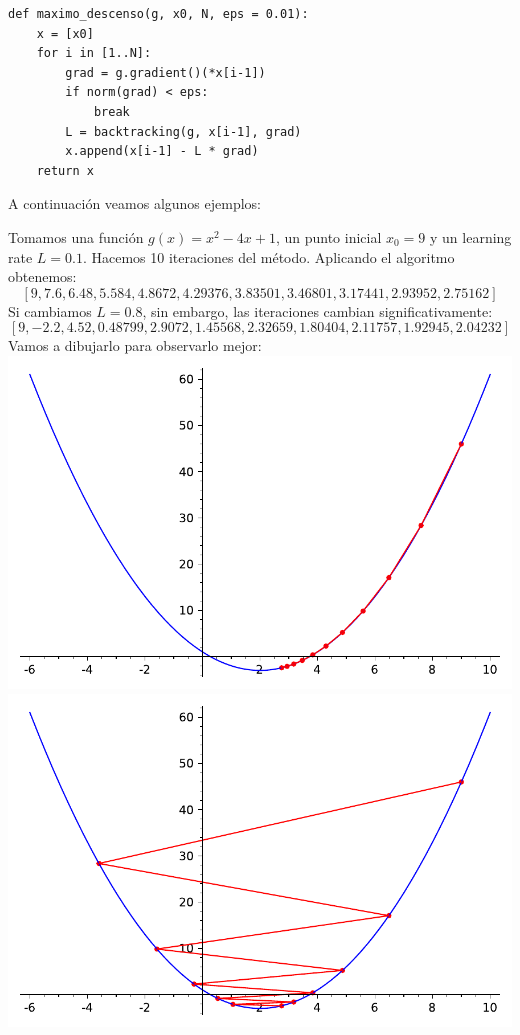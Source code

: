 \begin{verbatim}
def maximo_descenso(g, x0, N, eps = 0.01):
	x = [x0]
	for i in [1..N]:
		grad = g.gradient()(*x[i-1])
		if norm(grad) < eps:
			break
		L = backtracking(g, x[i-1], grad)
		x.append(x[i-1] - L * grad)
	return x
\end{verbatim}

A continuación veamos algunos ejemplos: 

\begin{example}
	Tomamos una función $g(x) = x^2 - 4x + 1$, un punto inicial $x_0 = 9$ y un learning rate $L = 0.1$. Hacemos 10 iteraciones del método. Aplicando el algoritmo obtenemos: $$[9,7.6,6.48,5.584,4.8672,4.29376,3.83501,3.46801,3.17441,2.93952,2.75162]$$ Si cambiamos $L = 0.8$, sin embargo, las iteraciones cambian significativamente: $$[9,-2.2,4.52,0.48799,2.9072,1.45568,2.32659,1.80404,2.11757,1.92945,2.04232]$$ Vamos a dibujarlo para observarlo mejor:\\
	\includegraphics[scale=0.5]{imagenes/ejemplo1_1_maximodescensosimplificado.pdf}
	\includegraphics[scale=0.5]{imagenes/ejemplo1_2_maximodescensosimplificado.pdf}\\

\end{example}
